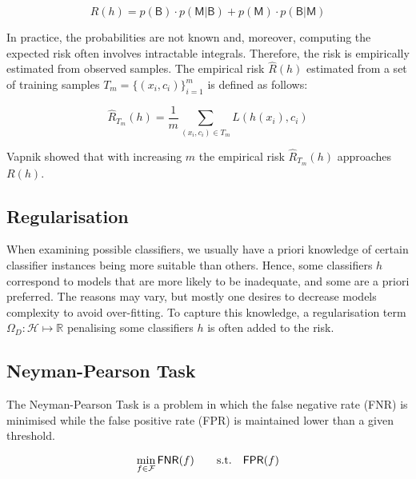 \begin{equation}
R(h) = p(\mathsf{B}) \cdot p(\mathsf{M}|\mathsf{B}) + p(\mathsf{M}) \cdot p(\mathsf{B}|\mathsf{M})
\end{equation}

In practice, the probabilities are not known and, moreover, computing
the expected risk often involves intractable integrals. Therefore, the
risk is empirically estimated from observed samples. The empirical risk
$\hat{R}(h)$ estimated from a set of training samples
$T_m = \{ (x_i, c_i) \}_{i=1}^{m}$ is defined as follows:

\begin{equation}
\hat{R}_{T_m}(h) = \frac{1}{m} \sum_{(x_i, c_i) \in T_m} L(h(x_i), c_i)
\end{equation}

Vapnik \cite{vapnik} showed that with increasing $m$ the empirical risk
$\hat{R}_{T_m}(h)$ approaches $R(h)$.

\subsection{Regularisation}

When examining possible classifiers, we usually have a priori knowledge
of certain classifier instances being more suitable than others. Hence,
some classifiers $h$ correspond to models that are more likely to be
inadequate, and some are a priori preferred. The reasons may vary, but
mostly one desires to decrease models complexity to avoid over-fitting.
To capture this knowledge, a regularisation term
$\Omega_D: \mathcal{H} \mapsto \mathbb{R}$ penalising some classifiers
$h$ is often added to the risk.

\subsection{Neyman-Pearson Task}\label{sec:neyman-pearson}
The Neyman-Pearson Task is a problem in which the false negative rate (\textsf{FNR}) is minimised while the false positive rate (FPR) is maintained lower than a given threshold.

\begin{equation}\label{eq:neyman-pearson}
    \min_{f \in \mathcal{F}}
        \textsf{FNR}(f)
        \qquad \text{s.t.} \quad
        \textsf{FPR}(f)
\end{equation}

